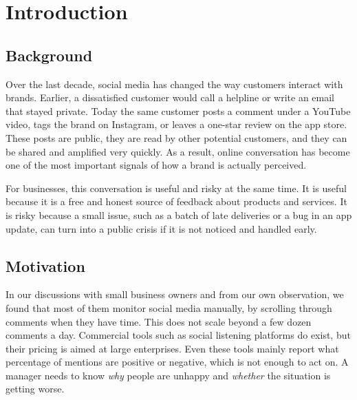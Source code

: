 \documentclass[conference]{IEEEtran}
\begin{document}
\section{Introduction}

\subsection{Background}
Over the last decade, social media has changed the way customers interact with brands. Earlier, a
dissatisfied customer would call a helpline or write an email that stayed private. Today the same
customer posts a comment under a YouTube video, tags the brand on Instagram, or leaves a one-star
review on the app store. These posts are public, they are read by other potential customers, and
they can be shared and amplified very quickly. As a result, online conversation has become one of
the most important signals of how a brand is actually perceived.

For businesses, this conversation is useful and risky at the same time. It is useful because it is a
free and honest source of feedback about products and services. It is risky because a small issue,
such as a batch of late deliveries or a bug in an app update, can turn into a public crisis if it is
not noticed and handled early.

\subsection{Motivation}
In our discussions with small business owners and from our own observation, we found that most of
them monitor social media manually, by scrolling through comments when they have time. This does not
scale beyond a few dozen comments a day. Commercial tools such as social listening platforms do
exist, but their pricing is aimed at large enterprises. Even these tools mainly report what
percentage of mentions are positive or negative, which is not enough to act on. A manager needs to
know \textit{why} people are unhappy and \textit{whether} the situation is getting worse.
\end{document}
